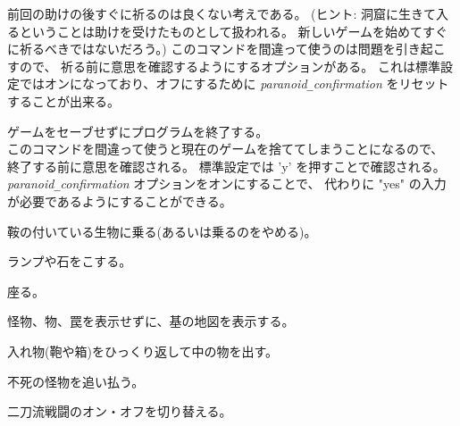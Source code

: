 前回の助けの後すぐに祈るのは良くない考えである。
(ヒント: 洞窟に生きて入るということは助けを受けたものとして扱われる。
新しいゲームを始めてすぐに祈るべきではないだろう。)
このコマンドを間違って使うのは問題を引き起こすので、
祈る前に意思を確認するようにするオプションがある。
これは標準設定ではオンになっており、オフにするために
{\it paranoid\verb+_+confirmation\/} をリセットすることが出来る。
\item[\tb{\#quit}]
ゲームをセーブせずにプログラムを終了する。\\
このコマンドを間違って使うと現在のゲームを捨ててしまうことになるので、
終了する前に意思を確認される。
標準設定では 'y' を押すことで確認される。
{\it paranoid\verb+_+confirmation\/} オプションをオンにすることで、
代わりに "yes" の入力が必要であるようにすることができる。
\item[\tb{\#ride}]
鞍の付いている生物に乗る(あるいは乗るのをやめる)。
\item[\tb{\#rub}]
ランプや石をこする。
\item[\tb{\#sit}]
座る。
\item[\tb{\#terrain}]
怪物、物、罠を表示せずに、基の地図を表示する。
\item[\tb{\#tip}]
入れ物(鞄や箱)をひっくり返して中の物を出す。
\item[\tb{\#turn}]
不死の怪物を追い払う。
\item[\tb{\#twoweapon}]
二刀流戦闘のオン・オフを切り替える。\\
